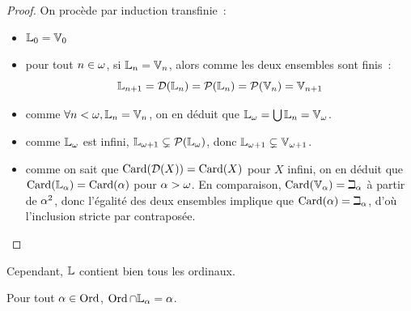 \begin{proof}
  On procède par induction transfinie~:
  \begin{itemize}
  \item $\mathbb L_0 = \mathbb V_0$
  \item pour tout $n \in \omega$, si $\mathbb L_n = \mathbb V_n$, alors comme
    les deux ensembles sont finis~:
    \[\mathbb L_{n+1} = \mathcal{D}(\mathbb L_n)
      = \mathcal{P}(\mathbb L_n)
      = \mathcal{P}(\mathbb V_n)
      = \mathbb V_{n+1}\]
  \item comme $\forall n < \omega, \mathbb L_n = \mathbb V_n$, on en déduit que
    $\mathbb L_\omega = \bigcup \mathbb L_n = \mathbb V_\omega$.
  \item comme $\mathbb L_\omega$ est infini,
    $\mathbb L_{\omega+1} \subsetneq \mathcal{P}(\mathbb L_\omega)$, donc
    $\mathbb L_{\omega+1} \subsetneq\mathbb V_{\omega+1}$.
  \item comme on sait que $\operatorname{Card}(\mathcal{D}(X)) = \operatorname{Card}(X)$ pour $X$ infini, on
    en déduit que $\operatorname{Card}(\mathbb L_{\alpha}) = \operatorname{Card}(\alpha)$ pour $\alpha > \omega$. En
    comparaison, $\operatorname{Card}(\mathbb V_{\alpha}) = \beth_\alpha$ à partir de $\alpha^2$, donc
    l'égalité des deux ensembles implique que $\operatorname{Card}(\alpha) = \beth_\alpha$, d'où
    l'inclusion stricte par contraposée.\qedhere
  \end{itemize}
\end{proof}

\noindent
Cependant, $\mathbb L$ contient bien tous les ordinaux.

\begin{proposition}
  Pour tout $\alpha \in \operatorname{Ord}$, $\operatorname{Ord} \cap \mathbb L_{\alpha} = \alpha$.
\end{proposition}

